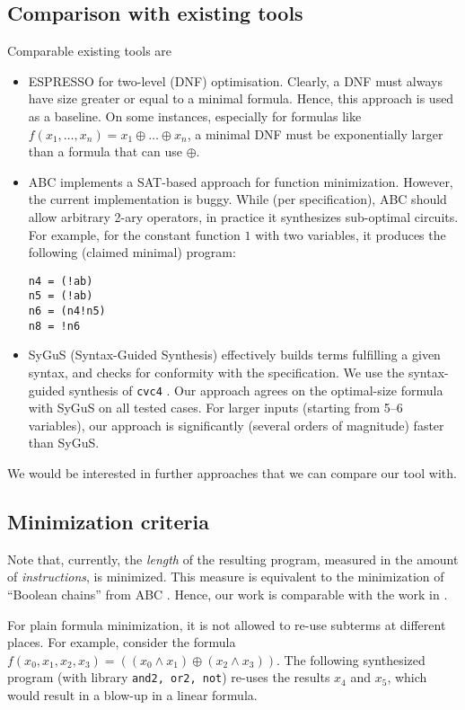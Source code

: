 \documentclass[a4paper]{article}
\begin{document}
\subsection{Comparison with existing tools}
Comparable existing tools are
\begin{itemize}
  \item ESPRESSO for two-level (DNF) optimisation. Clearly, a DNF must always have size greater or equal to a minimal formula. Hence, this approach is used as a baseline. On some instances, especially for formulas like $f(x_1, \dots, x_n) = x_1 \oplus \dots \oplus x_n$, a minimal DNF must be exponentially larger than a formula that can use $\oplus$. 
  \item ABC \cite{DBLP:journals/tcad/HaaswijkSMM20} implements a SAT-based approach for function minimization. However, the current implementation is buggy. While (per specification), ABC should allow arbitrary 2-ary operators, in practice it synthesizes sub-optimal circuits. For example, for the constant function $1$ with two variables, it produces the following (claimed minimal) program: 
  \begin{verbatim}
n4 = (!ab)
n5 = (!ab)
n6 = (n4!n5)
n8 = !n6
  \end{verbatim}
  \item SyGuS (Syntax-Guided Synthesis) effectively builds terms fulfilling a given syntax, and checks for conformity with the specification. We use the syntax-guided synthesis of \verb!cvc4! \cite{CVC4}. Our approach agrees on the optimal-size formula with SyGuS on all tested cases. For larger inputs (starting from 5--6 variables), our approach is significantly (several orders of magnitude) faster than SyGuS. 
\end{itemize}

We would be interested in further approaches that we can compare our tool with.


\subsection{Minimization criteria}

Note that, currently, the \emph{length} of the resulting program, measured in the amount of \emph{instructions}, is minimized.
This measure is equivalent to the minimization of ``Boolean chains'' from ABC \cite{DBLP:journals/tcad/HaaswijkSMM20}. Hence, our work is comparable with the work in \cite{DBLP:journals/tcad/HaaswijkSMM20}.

For plain formula minimization, it is not allowed to re-use subterms at different places. For example,
consider the formula $f(x_0, x_1, x_2, x_3) = ((x_0 \land x_1) \oplus (x_2 \land x_3))$. The following synthesized program (with library \verb!and2, or2, not!) re-uses the results $x_4$ and $x_5$, which would result in a blow-up in a linear formula.
\end{document}
